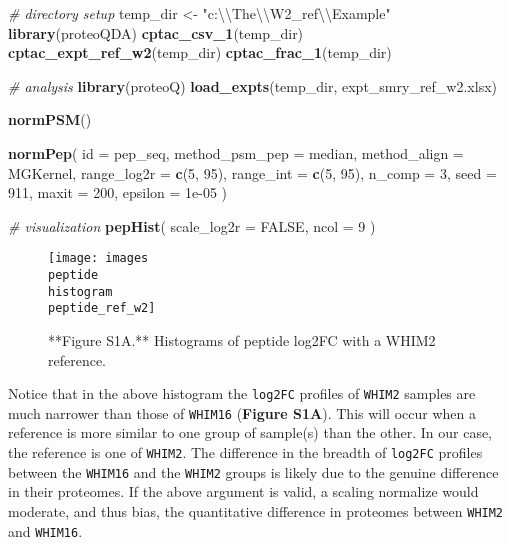 \documentclass[]{article}
\newenvironment{Shaded}{\begin{snugshade}}{\end{snugshade}}
\newcommand{\CharTok}[1]{\textcolor[rgb]{0.31,0.60,0.02}{#1}}
\newcommand{\CommentTok}[1]{\textcolor[rgb]{0.56,0.35,0.01}{\textit{#1}}}
\newcommand{\DataTypeTok}[1]{\textcolor[rgb]{0.13,0.29,0.53}{#1}}
\newcommand{\DecValTok}[1]{\textcolor[rgb]{0.00,0.00,0.81}{#1}}
\newcommand{\FloatTok}[1]{\textcolor[rgb]{0.00,0.00,0.81}{#1}}
\newcommand{\KeywordTok}[1]{\textcolor[rgb]{0.13,0.29,0.53}{\textbf{#1}}}
\newcommand{\NormalTok}[1]{#1}
\newcommand{\OtherTok}[1]{\textcolor[rgb]{0.56,0.35,0.01}{#1}}
\newcommand{\StringTok}[1]{\textcolor[rgb]{0.31,0.60,0.02}{#1}}
\begin{document}
\begin{Shaded}
\begin{Highlighting}[]
\CommentTok{# directory setup}
\NormalTok{temp_dir <-}\StringTok{ "c:}\CharTok{\textbackslash{}\textbackslash{}}\StringTok{The}\CharTok{\textbackslash{}\textbackslash{}}\StringTok{W2_ref}\CharTok{\textbackslash{}\textbackslash{}}\StringTok{Example"}
\KeywordTok{library}\NormalTok{(proteoQDA)}
\KeywordTok{cptac_csv_1}\NormalTok{(temp_dir)}
\KeywordTok{cptac_expt_ref_w2}\NormalTok{(temp_dir)}
\KeywordTok{cptac_frac_1}\NormalTok{(temp_dir)}

\CommentTok{# analysis}
\KeywordTok{library}\NormalTok{(proteoQ)}
\KeywordTok{load_expts}\NormalTok{(temp_dir, expt_smry_ref_w2.xlsx)}

\KeywordTok{normPSM}\NormalTok{()}

\KeywordTok{normPep}\NormalTok{(}
  \DataTypeTok{id =}\NormalTok{ pep_seq, }
  \DataTypeTok{method_psm_pep =}\NormalTok{ median, }
  \DataTypeTok{method_align =}\NormalTok{ MGKernel, }
  \DataTypeTok{range_log2r =} \KeywordTok{c}\NormalTok{(}\DecValTok{5}\NormalTok{, }\DecValTok{95}\NormalTok{), }
  \DataTypeTok{range_int =} \KeywordTok{c}\NormalTok{(}\DecValTok{5}\NormalTok{, }\DecValTok{95}\NormalTok{), }
  \DataTypeTok{n_comp =} \DecValTok{3}\NormalTok{, }
  \DataTypeTok{seed =} \DecValTok{911}\NormalTok{, }
  \DataTypeTok{maxit =} \DecValTok{200}\NormalTok{, }
  \DataTypeTok{epsilon =} \FloatTok{1e-05}
\NormalTok{)}

\CommentTok{# visualization}
\KeywordTok{pepHist}\NormalTok{(}
    \DataTypeTok{scale_log2r =} \OtherTok{FALSE}\NormalTok{, }
    \DataTypeTok{ncol =} \DecValTok{9}
\NormalTok{)}
\end{Highlighting}
\end{Shaded}

\begin{figure}

{\centering \texttt{[image: images\\peptide\\histogram\\peptide\_ref\_w2]} 

}

\caption{**Figure S1A.** Histograms of peptide log2FC with a WHIM2 reference.}\label{fig:Peptide_reference_effect_1}
\end{figure}

Notice that in the above histogram the \texttt{log2FC} profiles of
\texttt{WHIM2} samples are much narrower than those of \texttt{WHIM16}
(\textbf{Figure S1A}). This will occur when a reference is more similar
to one group of sample(s) than the other. In our case, the reference is
one of \texttt{WHIM2}. The difference in the breadth of \texttt{log2FC}
profiles between the \texttt{WHIM16} and the \texttt{WHIM2} groups is
likely due to the genuine difference in their proteomes. If the above
argument is valid, a scaling normalize would moderate, and thus bias,
the quantitative difference in proteomes between \texttt{WHIM2} and
\texttt{WHIM16}.
\end{document}
